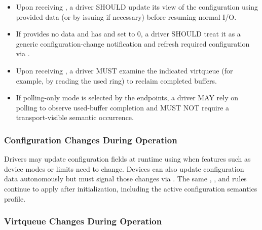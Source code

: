 \begin{itemize}
  \item Upon receiving , a driver SHOULD update its view of
        the configuration using provided data (or by issuing
         if necessary) before resuming normal I/O.
  \item If  provides no data and has
         and  set to 0, a driver SHOULD treat it as
        a generic configuration-change notification and refresh required
        configuration via .
  \item Upon receiving , a driver MUST examine the indicated
        virtqueue (for example, by reading the used ring) to reclaim completed
        buffers.
  \item If polling-only mode is selected by the endpoints, a driver MAY rely on
        polling to observe used-buffer completion and MUST NOT require a
        transport-visible  semantic occurrence.
\end{itemize}

\subsubsection{Configuration Changes During Operation}
\label{sec:Virtio Transport Options / Virtio Over Messages / Device Operation / Configuration Changes During Operation}

Drivers may update configuration fields at runtime using 
when features such as device modes or limits need to change. Devices can also
update configuration data autonomously but must signal those changes via
. The same , , and
 rules continue to apply after initialization, including
the active configuration semantics profile.

\subsubsection{Virtqueue Changes During Operation}
\label{sec:Virtio Transport Options / Virtio Over Messages / Device Operation / Virtqueue Changes During Operation}

